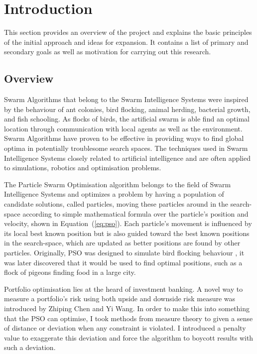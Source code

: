 \chapter{Introduction\label{chap:intro}}
This section provides an overview of the project and explains the basic principles of the initial approach and ideas for expansion. It contains a list of primary and secondary goals as well as motivation for carrying out this research.

  \section{Overview} %
  \label{sec:overview}
  Swarm Algorithms that belong to the Swarm Intelligence Systems were inspired by the behaviour of ant colonies, bird flocking, animal herding, bacterial growth, and fish schooling. As flocks of birds, the artificial swarm is able find an optimal location through communication with local agents as well as the environment. Swarm Algorithms have proven to be effective in providing ways to find global optima in potentially troublesome search spaces. The techniques used in Swarm Intelligence Systems closely related to artificial intelligence and are often applied to simulations, robotics and optimisation problems. 

  The Particle Swarm Optimisation algorithm belongs to the field of Swarm Intelligence Systems and optimizes a problem by having a population of candidate solutions, called particles, moving these particles around in the search-space according to simple mathematical formula over the particle's position and velocity, shown in Equation~(\ref{eq:pso}). Each particle's movement is influenced by its local best known position but is also guided toward the best known positions in the search-space, which are updated as better positions are found by other particles. Originally, PSO was designed to simulate bird flocking behaviour \cite{pso}, it was later discovered that it would be used to find optimal positions, such as a flock of pigeons finding food in a large city.

  Portfolio optimisation lies at the heard of investment banking. A novel way to measure a portfolio's risk using both upside and downside risk measure was introduced by Zhiping Chen and Yi Wang. In order to make this into something that the PSO can optimise, I took methods from measure theory to given a sense of distance or deviation when any constraint is violated. I introduced a penalty value to exaggerate this deviation and force the algorithm to boycott results with such a deviation.

